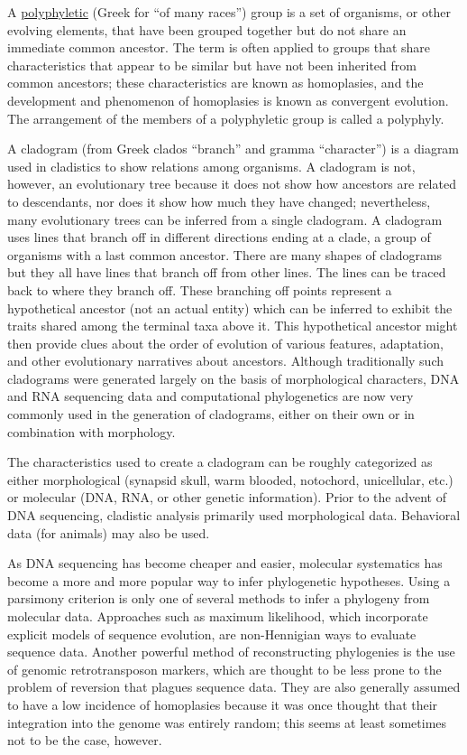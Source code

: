 A \href{https://en.wikipedia.org/wiki/Polyphyly}{polyphyletic} (Greek for ``of many races'') group is a set of organisms, or other evolving elements, that have been grouped together but do not share an immediate common ancestor. The term is often applied to groups that share characteristics that appear to be similar but have not been inherited from common ancestors; these characteristics are known as homoplasies, and the development and phenomenon of homoplasies is known as convergent evolution. The arrangement of the members of a polyphyletic group is called a polyphyly.

A cladogram (from Greek clados ``branch'' and gramma ``character'') is a diagram used in cladistics to show relations among organisms. A cladogram is not, however, an evolutionary tree because it does not show how ancestors are related to descendants, nor does it show how much they have changed; nevertheless, many evolutionary trees can be inferred from a single cladogram. A cladogram uses lines that branch off in different directions ending at a clade, a group of organisms with a last common ancestor. There are many shapes of cladograms but they all have lines that branch off from other lines. The lines can be traced back to where they branch off. These branching off points represent a hypothetical ancestor (not an actual entity) which can be inferred to exhibit the traits shared among the terminal taxa above it. This hypothetical ancestor might then provide clues about the order of evolution of various features, adaptation, and other evolutionary narratives about ancestors. Although traditionally such cladograms were generated largely on the basis of morphological characters, DNA and RNA sequencing data and computational phylogenetics are now very commonly used in the generation of cladograms, either on their own or in combination with morphology.

The characteristics used to create a cladogram can be roughly categorized as either morphological (synapsid skull, warm blooded, notochord, unicellular, etc.) or molecular (DNA, RNA, or other genetic information). Prior to the advent of DNA sequencing, cladistic analysis primarily used morphological data. Behavioral data (for animals) may also be used.

As DNA sequencing has become cheaper and easier, molecular systematics has become a more and more popular way to infer phylogenetic hypotheses. Using a parsimony criterion is only one of several methods to infer a phylogeny from molecular data. Approaches such as maximum likelihood, which incorporate explicit models of sequence evolution, are non-Hennigian ways to evaluate sequence data. Another powerful method of reconstructing phylogenies is the use of genomic retrotransposon markers, which are thought to be less prone to the problem of reversion that plagues sequence data. They are also generally assumed to have a low incidence of homoplasies because it was once thought that their integration into the genome was entirely random; this seems at least sometimes not to be the case, however.

